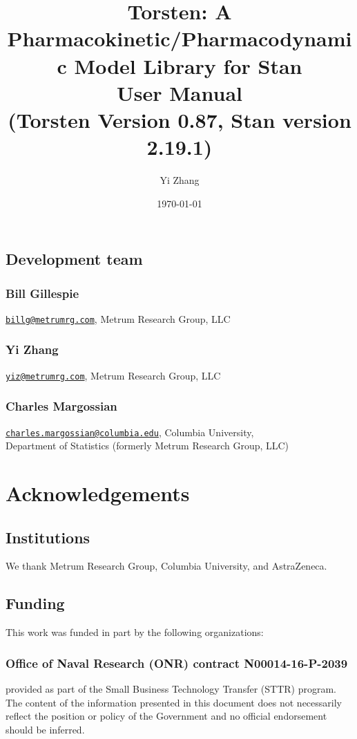 \documentclass[11pt, reqno, oneside]{amsbook}
\author{Yi Zhang}
\date{\today}
\title{Torsten: A Pharmacokinetic/Pharmacodynamic Model Library for Stan\\\medskip
\large User Manual \\  (Torsten Version 0.87, Stan version 2.19.1)}
\numberwithin{equation}{chapter}
\numberwithin{figure}{chapter}
\numberwithin{table}{chapter}
\theoremstyle{remark}
\begin{document}
\maketitle
\tableofcontents


\section*{Development team}
\label{sec:org084c121}
\subsection*{Bill Gillespie}
\label{sec:org41cdf12}
\href{mailto:billg@metrumrg.com}{\texttt{billg@metrumrg.com}},
Metrum Research Group, LLC
\subsection*{Yi Zhang}
\label{sec:orgeacf1ab}
\href{mailto:yiz@metrumrg.com}{\texttt{yiz@metrumrg.com}}, Metrum Research Group, LLC
\subsection*{Charles Margossian}
\label{sec:org9ab3585}
\noindent
\href{mailto:charles.margossian@columbia.edu}{\texttt{charles.margossian@columbia.edu}}, Columbia University, \\
\hspace*{0.5cm} Department of Statistics (formerly Metrum Research Group, LLC)

\chapter*{Acknowledgements}
\label{sec:orgfb3e09b}
\section*{Institutions}
\label{sec:org07349b1}
We thank Metrum Research Group, Columbia University, and AstraZeneca.
\section*{Funding}
\label{sec:org1f0c527}
This work was funded in part by the following organizations:
\subsection*{Office of Naval Research (ONR) contract N00014-16-P-2039}
\label{sec:org0f1a1fe}
provided as part of the Small Business Technology Transfer (STTR)
program. The content of the information presented in this document
does not necessarily reflect the position or policy of the
Government and no official endorsement should be inferred.
\end{document}
